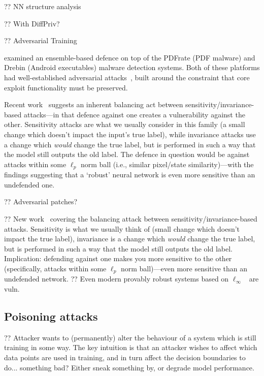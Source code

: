 ?? NN structure analysis~\parencite{DBLP:conf/eurosp/SperlKCLB20}

?? With DiffPriv?~\parencite{DBLP:conf/sp/LecuyerAG0J19}

?? Adversarial Training~\parencite{DBLP:conf/iclr/MadryMSTV18,DBLP:journals/corr/abs-1712-09196}

\Textcite{DBLP:conf/ndss/SmutzS16} examined an ensemble-based defence on top of the PDFrate (PDF malware) and Drebin (Android executables) malware detection systems.
Both of these platforms had well-established adversarial attacks~\parencite{DBLP:conf/ccs/MaiorcaCG13,DBLP:conf/sp/SrndicL14}, built around the constraint that core exploit functionality must be preserved.

Recent work~\parencite{DBLP:journals/corr/abs-2002-04599} suggests an inherent balancing act between sensitivity/invariance-based attacks---in that defence against one creates a vulnerability against the other.
Sensitivity attacks are what we usually consider in this family (a small change which doesn't impact the input's true label), while invariance attacks use a change which \emph{would} change the true label, but is performed in such a way that the model still outputs the old label.
The defence in question would be against attacks within some $\ell_p$ norm ball (i.e., similar pixel/state similarity)---with the findings suggesting that a `robust' neural network is even more sensitive than an undefended one.

?? Adversarial patches?~\parencite{DBLP:conf/uss/0001BSM21}

?? New work~\parencite{DBLP:journals/corr/abs-2002-04599} covering the balancing attack between sensitivity/invariance-based attacks. Sensitivity is what we usually think of (small change which doesn't impact the true label), invariance is a change which \emph{would} change the true label, but is performed in such a way that the model still outputs the old label. Implication: defending against one makes you more sensitive to the other (specifically, attacks within some $\ell_p$ norm ball)---even more sensitive than an undefended network.
?? Even modern provably robust systems based on $\ell_\infty$~\parencite{DBLP:conf/iclr/ZhangCXGSLBH20} are vuln.

\subsection{Poisoning attacks}
?? Attacker wants to (permanently) alter the behaviour of a system which is still training in some way.
The key intuition is that an attacker wishes to affect which data points are used in training, and in turn affect the decision boundaries to do... something bad?
Either sneak something by, or degrade model performance.

